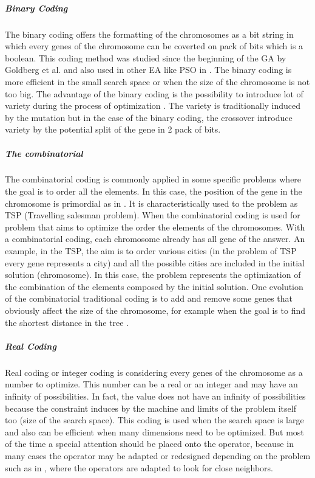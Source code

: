 \subparagraph*{Binary Coding}%
The binary coding offers the formatting of the chromosomes as a bit string in which every genes of the chromosome can be coverted on pack of bits which is a boolean. This coding method was studied since the beginning of the GA by Goldberg et al.  \cite{97*goldberg1985} and also used in other EA like PSO in \cite{87*morsly2012}. The binary coding is more efficient in the small search space or when the size of the chromosome is not too big. The advantage of the binary coding is the possibility to introduce lot of variety during the process of optimization \cite{73*wright1991}. The variety is traditionally induced by the mutation but in the case of the binary coding, the crossover introduce variety by the potential split of the gene in 2 pack of bits.
\\
\subparagraph*{The combinatorial  }%
The combinatorial  coding is commonly applied in some specific problems where the goal is to order all the elements. In this case, the position of the gene in the chromosome is primordial as in \cite{ 110*eiben2003}. It is characteristically used to the problem as TSP \cite{80*serpell2010} (Travelling salesman problem).  When the combinatorial  coding is used for problem that aims to optimize the order the elements of the chromosomes. With a combinatorial  coding, each chromosome already has all gene of the answer. An example, in the TSP, the aim is to order various cities (in the problem of TSP every gene represents a city) and all the possible cities are included in the initial solution (chromosome). In this case, the problem represents the optimization of the combination of the elements composed by the initial solution. 
One evolution of the combinatorial traditional coding is to add and remove some genes that obviously affect the size of the chromosome, for example  when the goal is to find the shortest distance in the tree \cite{113*mais2010}. \\

\subparagraph*{Real Coding }%
Real coding or integer coding is considering every genes of the chromosome as a number to optimize. This number can be a real or an integer and may have an infinity of possibilities. In fact, the value does not have an infinity of possibilities because the constraint induces by the machine and limits of the problem itself too (size of the search space). This coding is used when the search space is large and also can be efficient when many dimensions need to be optimized. But most of the time a special attention should be placed onto the operator, because in many cases the operator may be adapted or redesigned depending on the problem such as in \cite{68*muhlenbein1989},  where the operators are adapted to look for close neighbors.\\

